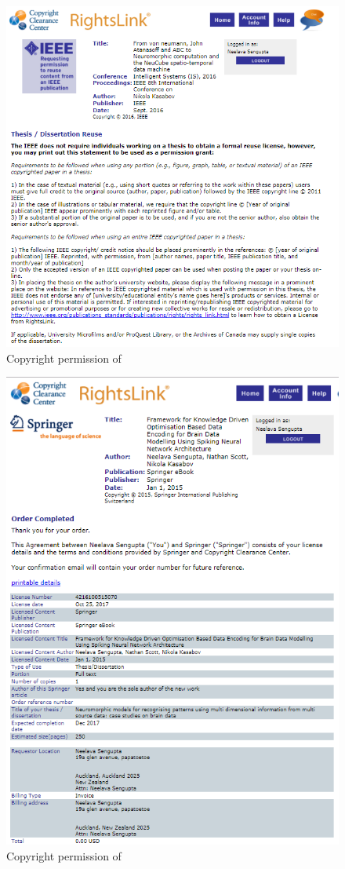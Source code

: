 \begin{figure}
	\centering
	\includegraphics[width=0.8\linewidth]{fig/copyrights/ieee_is_von_neumann.PNG}
	\caption{Copyright permission of \citet{kasabov2016neumann}}
\end{figure}

\begin{figure}
	\centering
	\includegraphics[width=0.8\linewidth]{fig/copyrights/springer_framework.PNG}
	\caption{Copyright permission of \citet{sengupta2015framework}}
\end{figure}


